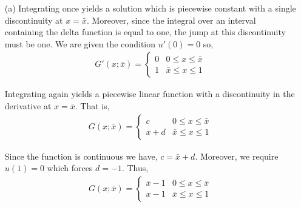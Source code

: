 \documentclass[10pt]{article}
\begin{document}
\begin{solution}[Solution]

\begin{enumerate}
    \item[(a)] 
        Integrating once yields a solution which is piecewise constant with a single discontinuity at \( x=\bar{x} \). Moreover, since the integral over an interval containing the delta function is equal to one, the jump at this discontinuity must be one. We are given the condition \( u'(0) = 0 \) so,
        \begin{align*}
            G'(x;\bar{x}) = \begin{cases}
                0 & 0 \leq x\leq \bar{x} \\
                1 & \bar{x} \leq x \leq 1
            \end{cases}
        \end{align*}

        Integrating again yields a piecewise linear function with a discontinuity in the derivative at \( x=\bar{x} \).
        That is,
        \begin{align*}
            G(x;\bar{x}) = \begin{cases}
                c & 0 \leq x \leq \bar{x} \\
                x + d & \bar{x} \leq x \leq 1
            \end{cases}
        \end{align*}
        
        Since the function is continuous we have, \( c = \bar{x} + d \). Moreover, we require \( u(1) = 0 \) which forces \( d=-1 \). Thus,
        \begin{align*}
            G(x;\bar{x}) = \begin{cases}
                \bar{x}-1 & 0 \leq x \leq \bar{x} \\
                x-1 & \bar{x} \leq x \leq 1
            \end{cases}
        \end{align*}


\end{enumerate}
\end{solution}
\end{document}
